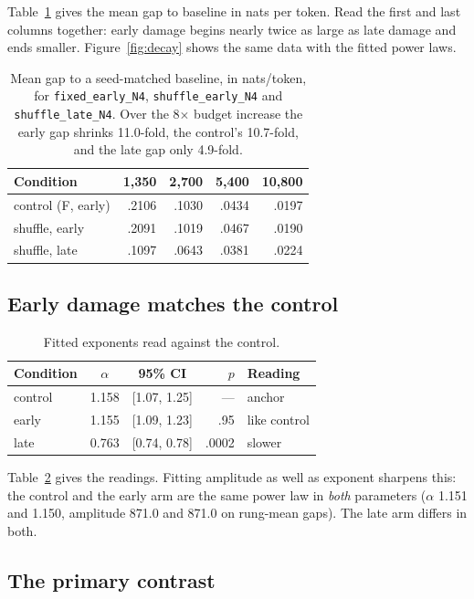 \documentclass[11pt]{article}
\newcommand{\cond}[1]{\texttt{#1}}
\begin{document}
Table~\ref{tab:gaps} gives the mean gap to baseline in nats per token. Read the
first and last columns together: early damage begins nearly twice as large as
late damage and ends smaller. Figure~\ref{fig:decay} shows the same data with the
fitted power laws.

\begin{table}[t]
\centering\small
\begin{tabular}{lrrrr}
\toprule
Condition & 1{,}350 & 2{,}700 & 5{,}400 & 10{,}800 \\
\midrule
control (F, early) & .2106 & .1030 & .0434 & .0197 \\
shuffle, early     & .2091 & .1019 & .0467 & .0190 \\
shuffle, late      & .1097 & .0643 & .0381 & .0224 \\
\bottomrule
\end{tabular}
\caption{Mean gap to a seed-matched baseline, in nats/token, for
\cond{fixed\_early\_N4}, \cond{shuffle\_early\_N4} and \cond{shuffle\_late\_N4}.
Over the 8$\times$ budget increase the early gap shrinks 11.0-fold, the control's
10.7-fold, and the late gap only 4.9-fold.}
\label{tab:gaps}
\end{table}

\subsection{Early damage matches the control}

\begin{table}[t]
\centering\small
\begin{tabular}{lccrl}
\toprule
Condition & $\alpha$ & 95\% CI & $p$ & Reading \\
\midrule
control & 1.158 & [1.07, 1.25] & --- & anchor \\
early   & 1.155 & [1.09, 1.23] & .95 & like control \\
late    & 0.763 & [0.74, 0.78] & .0002 & slower \\
\bottomrule
\end{tabular}
\caption{Fitted exponents read against the control.}
\label{tab:alphas}
\end{table}

Table~\ref{tab:alphas} gives the readings. Fitting amplitude as well as exponent
sharpens this: the control and the early arm are the same power law in
\emph{both} parameters ($\alpha$ 1.151 and 1.150, amplitude 871.0 and 871.0 on
rung-mean gaps). The late arm differs in both.

\subsection{The primary contrast}
\end{document}

